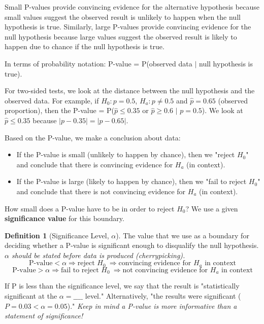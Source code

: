 \documentclass[12pt, a4paper]{article}
\theoremstyle{definition}
\newtheorem{definition}{Definition}
\begin{document}
Small P-values provide convincing evidence for the alternative hypothesis because small values suggest the observed result is unlikely to happen when the null hypothesis is true.
Similarly, large P-values provide convincing evidence for the null hypothesis because large values suggest the observed result is likely to happen due to chance if the null hypothesis is true.

In terms of probability notation: P-value = P(observed data $|$ null hypothesis is true).

For two-sided tests, we look at the distance between the null hypothesis and the observed data.
For example, if $H_0: p = 0.5$, $H_a: p \neq 0.5$ and $\hat{p} = 0.65$ (observed proportion), then the P-value = P($\hat{p} \leq 0.35$ or $\hat{p} \geq 0.6$ $|$  $p = 0.5$).
We look at $\hat{p} \leq 0.35$ because $|p - 0.35| = |p - 0.65|$.

Based on the P-value, we make a conclusion about data:
\begin{itemize}
    \item If the P-value is small (unlikely to happen by chance), then we "reject $H_0$" and conclude that there is convincing evidence for $H_a$ (in context).
    \item If the P-value is large (likely to happen by chance), then we "fail to reject $H_0$" and conclude that there is not convincing evidence for $H_a$ (in context).
\end{itemize}

How small does a P-value have to be in order to reject $H_0$? We use a given \textbf{significance value} for this boundary.

\begin{definition}[Significance Level, $\alpha$]
    The value that we use as a boundary for deciding whether a P-value is significant enough to disqualify the null hypothesis. \textit{$\alpha$ should be stated before data is produced (cherrypicking).}
    \[\textrm{P-value} < \alpha \Rightarrow \textrm{reject } H_0\ \Rightarrow \textrm{convincing evidence for $H_a$ in context}\]
    \[\textrm{P-value} > \alpha \Rightarrow \textrm{fail to reject } H_0\ \Rightarrow \textrm{not convincing evidence for $H_a$ in context}\]
\end{definition}

If P is less than the significance level, we say that the result is "statistically significant at the $\alpha = \_\_\_\_$ level."
Alternatively, "the results were significant ($P = 0.03 < \alpha = 0.05$)."
\textit{Keep in mind a P-value is more informative than a statement of significance!}
\end{document}
